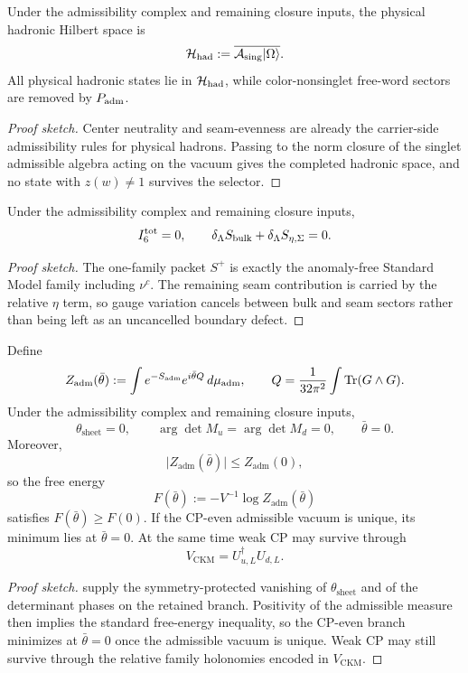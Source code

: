 \begin{theorem}
Under the admissibility complex and remaining closure inputs, the physical hadronic Hilbert space is
\[
\mathcal H_{\mathrm{had}}:=\overline{\mathcal A_{\mathrm{sing}}|\Omega\rangle}.
\]
All physical hadronic states lie in $\mathcal H_{\mathrm{had}}$, while color-nonsinglet free-word sectors are removed by $P_{\mathrm{adm}}$.
\end{theorem}

\begin{proof}[Proof sketch]
Center neutrality and seam-evenness are already the carrier-side admissibility rules for physical hadrons. Passing to the norm closure of the singlet admissible algebra acting on the vacuum gives the completed hadronic space, and no state with $z(w)\neq 1$ survives the selector.
\end{proof}

\begin{theorem}
Under the admissibility complex and remaining closure inputs,
\[
I_6^{\mathrm{tot}}=0,
\qquad
\delta_\Lambda S_{\mathrm{bulk}}+\delta_\Lambda S_{\eta,\Sigma}=0.
\]
\end{theorem}

\begin{proof}[Proof sketch]
The one-family packet $S^+$ is exactly the anomaly-free Standard Model family including $\nu^c$. The remaining seam contribution is carried by the relative $\eta$ term, so gauge variation cancels between bulk and seam sectors rather than being left as an uncancelled boundary defect.
\end{proof}

\begin{theorem}
\label{thm:strong-cp-closure}
Define
\[
Z_{\mathrm{adm}}(\bar\theta)
:=
\int e^{-S_{\mathrm{adm}}}e^{i\bar\theta Q}\,d\mu_{\mathrm{adm}},
\qquad
Q=\frac{1}{32\pi^2}\int \operatorname{Tr}(G\wedge G).
\]
Under the admissibility complex and remaining closure inputs,
\[
\theta_{\mathrm{sheet}}=0,
\qquad
\arg\det M_u=\arg\det M_d=0,
\qquad
\bar\theta=0.
\]
Moreover,
\[
\bigl|Z_{\mathrm{adm}}(\bar\theta)\bigr|\le Z_{\mathrm{adm}}(0),
\]
so the free energy
\[
F(\bar\theta):=-V^{-1}\log Z_{\mathrm{adm}}(\bar\theta)
\]
satisfies $F(\bar\theta)\ge F(0)$. If the CP-even admissible vacuum is unique, its minimum lies at $\bar\theta=0$. At the same time weak CP may survive through
\[
V_{\mathrm{CKM}}=U_{u,L}^\dagger U_{d,L}.
\]
\end{theorem}

\begin{proof}[Proof sketch]
 supply the symmetry-protected vanishing of $\theta_{\mathrm{sheet}}$ and of the determinant phases on the retained branch. Positivity of the admissible measure then implies the standard free-energy inequality, so the CP-even branch minimizes at $\bar\theta=0$ once the admissible vacuum is unique. Weak CP may still survive through the relative family holonomies encoded in $V_{\mathrm{CKM}}$.
\end{proof}

